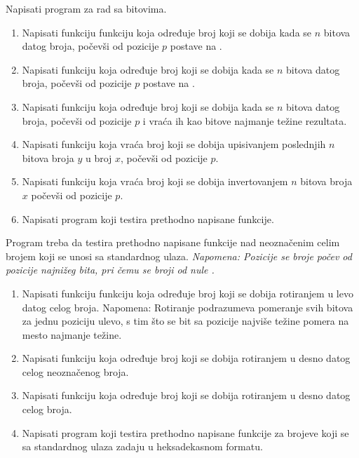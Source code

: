 \begin{Exercise}[label=204]
Napisati program za rad sa bitovima.
\begin{enumerate}
\item Napisati funkciju funkciju koja određuje broj koji se dobija kada se $n$ bitova datog broja, počevši od pozicije $p$ postave na .
\item Napisati funkciju koja određuje broj koji se dobija kada se $n$ bitova datog broja, počevši od pozicije $p$ postave na .
\item Napisati funkciju koja određuje broj koji se dobija kada se $n$ bitova datog broja, počevši od pozicije $p$ i vraća ih kao bitove najmanje težine rezultata.
\item Napisati funkciju koja vraća broj koji se dobija upisivanjem poslednjih $n$ bitova broja $y$ u broj $x$, počevši od pozicije $p$.
\item Napisati funkciju koja vraća broj koji se dobija invertovanjem $n$ bitova broja $x$ počevši od pozicije $p$.
\item Napisati program koji testira prethodno napisane funkcije.
\end{enumerate}
Program treba da testira prethodno napisane funkcije nad neoznačenim celim brojem koji se unosi sa standardnog ulaza.
\emph{Napomena: Pozicije se broje počev od pozicije najnižeg bita, pri čemu se broji od nule .}
\end{Exercise}
\begin{Answer}[ref=204]
\end{Answer}


\begin{Exercise}[label=205]
\begin{enumerate}
\item Napisati funkciju funkciju koja određuje broj koji se dobija rotiranjem u levo datog celog broja. Napomena: Rotiranje podrazumeva pomeranje svih bitova za jednu poziciju ulevo, s tim što se bit sa pozicije najviše težine pomera na mesto najmanje težine.
\item Napisati funkciju koja određuje broj koji se dobija rotiranjem u desno datog celog neoznačenog broja. 
\item Napisati funkciju koja određuje broj koji se dobija rotiranjem u desno datog celog broja.
\item Napisati program koji testira prethodno napisane funkcije za brojeve koji se sa standardnog ulaza zadaju u heksadekasnom formatu. 
\end{enumerate}
\end{Exercise}
\begin{Answer}[ref=205]
\end{Answer}

